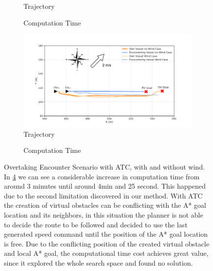         \begin{figure}[H]
        \centering
        
            \begin{subfigure}[b]{0.49\textwidth}
                \centering
                
                \caption{Trajectory}
                \label{fig:plot_ov_w_vs_wo}
            \end{subfigure}
            \begin{subfigure}[b]{0.49\textwidth}
                \centering
                
                \caption{Computation Time}
                \label{fig:plot_ov_w_vs_wo_CT}
            \end{subfigure}
            
            \begin{subfigure}[b]{0.49\textwidth}
                \centering
                \includegraphics[width=\textwidth]{figs/Chap5/plot_ov_w_vs_wind.pdf}
                \caption{Trajectory}
                \label{fig:plot_ov_w_vs_wind}
            \end{subfigure}
            \begin{subfigure}[b]{0.49\textwidth}
                \centering
                
                \caption{Computation Time}
                \label{fig:plot_ov_w_vs_wind_CT}
            \end{subfigure}
        
        \caption{Overtaking Encounter Scenario with \ac{ATC}, with and without wind. In \ref{fig:plot_ov_w_vs_wind_CT} we can see a considerable increase in computation time from around 3 minutes until around 4min and 25 second. This happened due to the second limitation discovered in our method. With \ac{ATC} the creation of virtual obstacles can be conflicting with the A* goal location and its neighbors, in this situation the planner is not able to decide the route to be followed and decided to use the last generated speed command until the position of the A* goal location is free. Due to the conflicting position of the created virtual obstacle and local A* goal, the computational time cost achieves great value, since it explored the whole search space and found no solution.}
        \label{fig:plots_ov}
        \end{figure}
        
